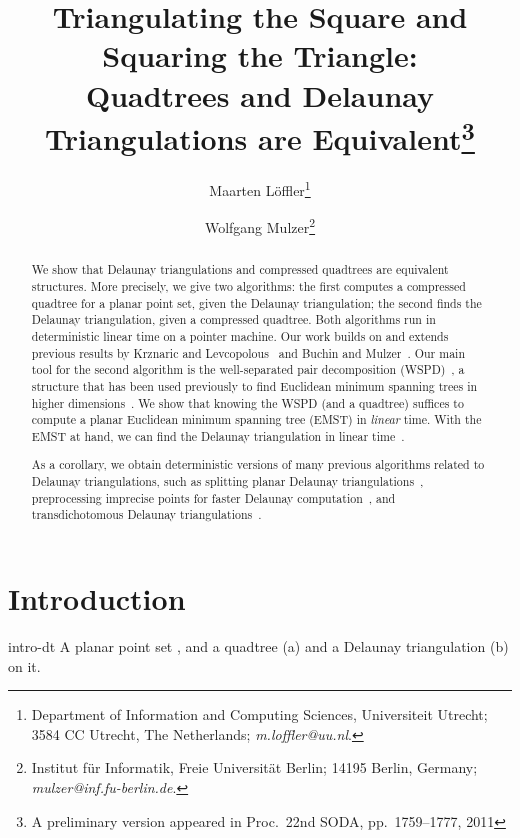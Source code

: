 \documentclass[11pt]{paper}
\title{\Large Triangulating the Square and Squaring the Triangle:\\ 
Quadtrees and Delaunay 
Triangulations are Equivalent\footnote{A preliminary version 
appeared in Proc.~22nd SODA, pp.~1759--1777, 2011}}
\author{Maarten L\"offler\thanks{Department of Information and Computing Sciences,
   Universiteit Utrecht;
   3584 CC Utrecht,
   The Netherlands;
   \textsl{m.loffler@uu.nl}.
  }
\and
Wolfgang Mulzer\thanks{Institut f{\"u}r Informatik,
  Freie Universit{\"a}t Berlin; 14195 Berlin, Germany;
  \textsl{mulzer@inf.fu-berlin.de}.
      }
}
\date{}
\begin{document}
\maketitle



\begin{abstract}
  We show that Delaunay triangulations and compressed quadtrees are equivalent
  structures. More precisely, we give two algorithms: the first computes
  a compressed quadtree for a planar point set, given the Delaunay
  triangulation; the second finds the Delaunay triangulation, given a
  compressed quadtree. Both algorithms run in deterministic linear time on
  a pointer machine.
  Our work builds on and extends previous
  results by Krznaric and Levcopolous~\cite{KrznaricLe98} and
  Buchin and Mulzer~\cite{BuchinMu11}. Our main tool for the second 
  algorithm is the
  well-separated pair decomposition (WSPD)~\cite{CallahanKo95},
  a structure that has been used previously to find Euclidean minimum
  spanning trees in higher dimensions~\cite{Eppstein00}. We show that knowing
  the WSPD (and a quadtree) suffices to compute
  a planar Euclidean minimum spanning tree (EMST) in \emph{linear} time. 
  With the EMST
  at hand, we can find the Delaunay triangulation in
  linear time~\cite{ChinWa99}.

  As a corollary, we obtain
  deterministic versions of many previous algorithms related
  to Delaunay triangulations, such as
  splitting planar Delaunay
  triangulations~\cite{ChazelleDeHuMoSaTe02,ChazelleMu11},
  preprocessing imprecise points for faster Delaunay
  computation~\cite{BuchinLoMoMuXX,LoefflerSn10}, and transdichotomous
  Delaunay triangulations~\cite{BuchinMu11,ChanPa09,ChanPa10}.
\end{abstract}

\section {Introduction}

   {intro-dt} {A planar point set , and a quadtree (a) and a Delaunay triangulation (b) on it.}
\end{document}
